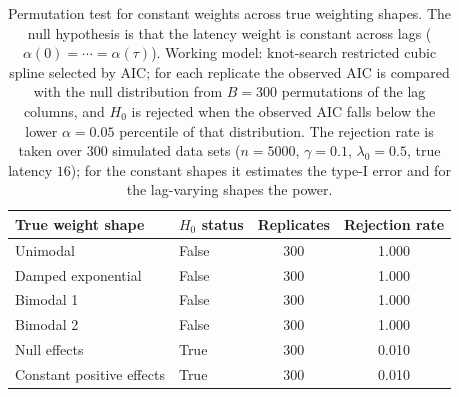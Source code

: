 \documentclass{article}
\begin{document}
\begin{table}[ht]
\centering
\caption{Permutation test for constant weights across true weighting shapes.
The null hypothesis is that the latency weight is constant across lags
($\alpha(0)=\cdots=\alpha(\tau)$). Working model: knot-search restricted cubic
spline selected by AIC; for each replicate the observed AIC is compared with the
null distribution from $B=300$ permutations of the lag columns, and $H_0$ is
rejected when the observed AIC falls below the lower $\alpha=0.05$ percentile of
that distribution. The rejection rate is taken over $300$ simulated data sets
($n=5000$, $\gamma=0.1$, $\lambda_0=0.5$, true latency $16$); for the constant
shapes it estimates the type-I error and for the lag-varying shapes the power.}
\label{tab:permtest}
\begin{tabular}{l l c S}
\toprule
True weight shape & $H_0$ status & Replicates & {Rejection rate} \\
\midrule
Unimodal & False & 300 & 1.000 \\
Damped exponential & False & 300 & 1.000 \\
Bimodal 1 & False & 300 & 1.000 \\
Bimodal 2 & False & 300 & 1.000 \\
Null effects & True & 300 & 0.010 \\
Constant positive effects & True & 300 & 0.010 \\
\bottomrule
\end{tabular}
\end{table}
\end{document}
